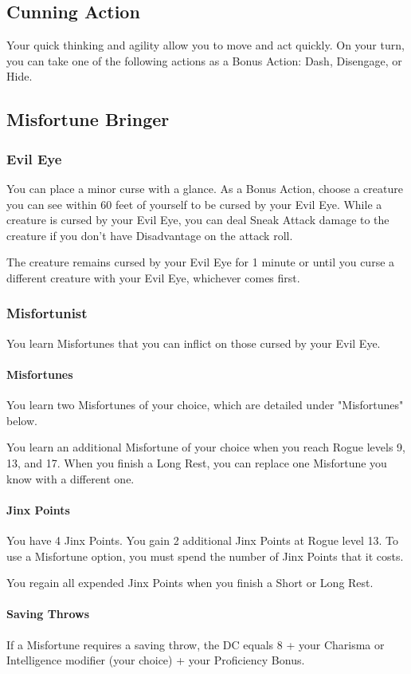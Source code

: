 \documentclass[letterpaper,openany,oneside,twocolumn]{book}
\begin{document}
\subsection*{Cunning Action}
Your quick thinking and agility allow you to move and act quickly. On your turn, you can take one of the following actions as a Bonus Action: Dash, Disengage, or Hide.
\subsection*{Misfortune Bringer}
\subsubsection*{Evil Eye}
You can place a minor curse with a glance. As a Bonus Action, choose a creature you can see within 60 feet of yourself to be cursed by your Evil Eye. While a creature is cursed by your Evil Eye, you can deal Sneak Attack damage to the creature if you don't have Disadvantage on the attack roll.

The creature remains cursed by your Evil Eye for 1 minute or until you curse a different creature with your Evil Eye, whichever comes first.
\subsubsection*{Misfortunist}
You learn Misfortunes that you can inflict on those cursed by your Evil Eye.

\paragraph*{Misfortunes} You learn two Misfortunes of your choice, which are detailed under "Misfortunes" below.

You learn an additional Misfortune of your choice when you reach Rogue levels 9, 13, and 17. When you finish a Long Rest, you can replace one Misfortune you know with a different one.

\paragraph*{Jinx Points} You have 4 Jinx Points. You gain 2 additional Jinx Points at Rogue level 13. To use a Misfortune option, you must spend the number of Jinx Points that it costs.

You regain all expended Jinx Points when you finish a Short or Long Rest.

\paragraph*{Saving Throws} If a Misfortune requires a saving throw, the DC equals 8 + your Charisma or Intelligence modifier (your choice) + your Proficiency Bonus.
\end{document}
